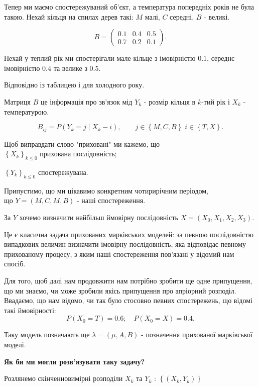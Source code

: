 \begin{example}
Тепер ми маємо спостережуваний об'єкт, а температура попередніх років не була такою.
Нехай кільця на спилах дерев такі: $M$ малі, $C$ середні, $B$ - великі.

\[
B = \begin{pmatrix}
  0.1 & 0.4 & 0.5 \\
  0.7 & 0.2 & 0.1
\end{pmatrix}
.\] 

Нехай у теплий рік ми спостерігали мале кільце з імовірністю $0.1$, середнє імовірністю
 $0.4$ та велике з $0.5$.

Відповідно із таблицею і для холодного року.

Матриця $B$ це інформація про зв'язок мід $Y_k$ - розмір кільця в $k$-тий рік і
$X_k$ - температурою.

\[
  B_{ij} = P \left( Y_k = j  \mid X_k - i \right),
  \qquad j \in \left\{ M,C,B \right\} \; i \in \left\{ T, X \right\} 
.\]

Щоб виправдати слово "приховані" ми кажемо, що\\
$\left\{ X_k \right\}_{k\leq 0}$ прихована послідовність;

$\left\{ Y_k \right\}_{k \leq 0}$ спостережувана.

Припустимо, що ми цікавимо конкретним чотирирічним періодом,\\
що $Y = \left( M, C, M, B \right)$ - наші спостереження.

За $Y$ хочемо визначити найбільш ймовірну послідовність $X = \left( X_0, X_1, X_2, X_3 \right)$.

Це є класична задача прихованих марківських моделей: за певною послідовністю випадкових величин визначити
імовірну послідовність, яка відповідає певному прихованому процесу, з яким наші спостереження пов'язані у
відомий нам спосіб.

Для того, щоб далі нам продовжити нам потрібно зробити ще одне припущення, що ми знаємо, чи може зробили
якісь припущення про апріорний розподіл.
Ввадаємо, що нам відомо, чи так було стосовно певних спостережень, що відомі такі ймовірності:
\[
P \left( X_0 = T  \right) = 0.6; \quad P \left( X_0 = X \right) = 0.4
.\] 

Таку модель позначають ще $\lambda = \left( \mu, A, B \right) $ - позначення прихованої марківської
моделі.

\textbf{Як би ми могли розв'язувати таку задачу?}

Розлянемо скінченновимірні розподіли $X_k$ та $Y_k $ : $\left\{ \left( X_k, Y_k \right)  \right\}$ 


\end{example}
